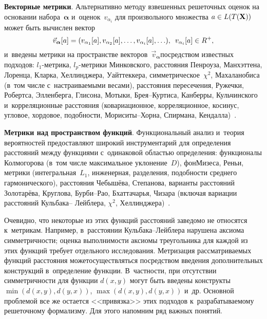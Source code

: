 \begin{multicols}{2}
\textbf{Векторные метрики}. Альтернативно методу взвешенных решеточных 
оценок на основании набора~$\bm{\alpha}$ и~оценок~$v_{\alpha_i}$ для 
произвольного множества $a\hm\in L(T(\mathbf{X}))$ может быть вычислен 
вектор 
$$
\vec{v}_{\bm{\alpha}} [a]= (v_{\alpha_1}[a], v_{\alpha_2}[a], \ldots , 
v_{\alpha_i}[a],\ldots),\enskip v_{\alpha_i}[a]\hm\in R^+,
$$
 и~введены метрики на 
пространстве векторов~$\vec{v}_{\bm{\alpha}}$\linebreak   посредством известных подходов: $l_1$-мет\-ри\-ка, 
$l_p$-мет\-ри\-ки Минковского, расстояния Пенроуза, Манхэттена, Лоренца, 
Кларка, Хеллинджера, Уайттеккера, симметрическое~$\chi^2$, Махаланобиса 
(в~том числе с~настраиваемыми весами), расстояния пересечения, Ружечки, 
Робертса, Элленберга, Глисона, Мотыки, Брея--Кур\-ти\-са, Канберры, 
Кульчинского и~корреляционные расстояния (ковариационное, 
корреляционное, косинус, угловое, хордовое, подобности,  
Мо\-ри\-си\-ты--Хор\-на, Спирмана, Кендалла)~\cite{8-tr}.
    
\textbf{Метрики над пространством функций}. Функциональный анализ 
и~теория вероятностей предо\-став\-ля\-ют широкий инструментарий для 
определения расстояний между функциями с~одинаковой областью 
определения: функционалы Колмогорова (в~том числе максимальное 
уклонение~$D$), фон\linebreak Мизеса, Реньи, метрики (интегральная~$L_1$, 
инженерная, разделения, подобности среднего гармонического), расстояния 
Чебышёва, Степанова, варианты расстояний Золотарёва, Круглова,  
Бур\-би--Рао, Бхаттачарья, Чизара (включая вариации расстояний Куль\-ба\-ка--
Лейб\-ле\-ра, $\chi^2$, Хеллинджера)~\cite{8-tr}.
     
     Очевидно, что некоторые из этих функций расстояний заведомо не 
относятся к~метрикам. Например, в~расстоянии Куль\-ба\-ка--Лейб\-ле\-ра 
нарушена аксиома симметричности; оценка \mbox{выполнимости} аксиомы 
треугольника для каждой из этих функций требует отдельного исследования. 
Метриза\-ция рассматриваемых функций расстояния может\linebreak осуществляться 
посредством введения дополнительных конструкций в~определение функции. 
В~част\-ности, при отсутствии симметричности для функции $d(x,y)$ могут быть 
введены конструкты $\min(d(x,y), d(y,x))$, $\max(d(x,y), d(y,x))$ и~др. 
Основной проблемой все же остается <<привязка>> этих подходов 
к~разрабатываемому решеточному формализму. Для этого напомним ряд 
важных понятий.
     
     \smallskip
     

\end{multicols}
